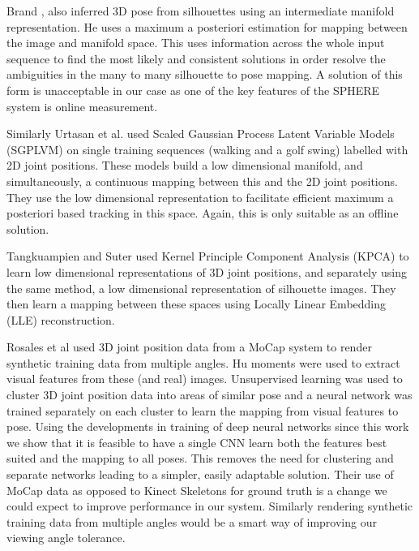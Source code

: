 \documentclass[11pt]{article} %
\begin{document}
Brand \cite{Brand1999}, also inferred 3D pose from silhouettes using an intermediate manifold representation. He uses a maximum a posteriori estimation for mapping between the image and manifold space. This uses information across the whole input sequence to find the most likely and consistent solutions in order resolve the ambiguities in the many to many silhouette to pose mapping. A solution of this form is unacceptable in our case as one of the key features of the SPHERE system is online measurement.

Similarly Urtasan et al. \cite{Urtasun2005} used Scaled Gaussian Process Latent Variable Models (SGPLVM) \cite{Lawrence2004} on single training sequences (walking and a golf swing) labelled with 2D joint positions. These models build a low dimensional manifold, and simultaneously, a continuous mapping between this and the 2D joint positions. They use the low dimensional representation to facilitate efficient maximum a posteriori based tracking in this space. Again, this is only suitable as an offline solution. 

Tangkuampien and Suter \cite{Tangkuampien2006} used Kernel Principle Component Analysis (KPCA) to learn low dimensional representations of 3D joint positions, and separately using the same method, a low dimensional representation of silhouette images. They then learn a mapping between these spaces using Locally Linear Embedding (LLE) reconstruction.%

Rosales et al \cite{Rosales2000,Rosales2001} used 3D joint position data from a MoCap system to render synthetic training data from multiple angles. Hu moments were used to extract visual features from these (and real) images. Unsupervised learning was used to cluster 3D joint position data into areas of similar pose and a neural network was trained separately on each cluster to learn the mapping from visual features to pose. Using the developments in training of deep neural networks since this work we show that it is feasible to have a single CNN learn both the features best suited and the mapping to all poses. This removes the need for clustering and separate networks leading to a simpler, easily adaptable solution. Their use of MoCap data as opposed to Kinect Skeletons for ground truth is a change we could expect to improve performance in our system. Similarly rendering synthetic training data from multiple angles would be a smart way of improving our viewing angle tolerance.
\end{document}
